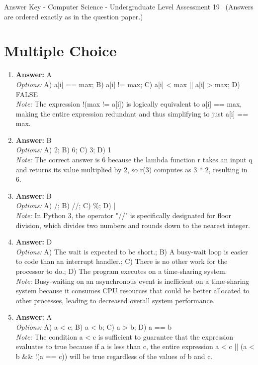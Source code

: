 \documentclass[12pt]{article}
\begin{document}
\begin{center}
Answer Key - Computer Science - Undergraduate Level Assessment 19 \
\small (Answers are ordered exactly as in the question paper.)
\end{center}

\section*{Multiple Choice}
\begin{enumerate}[label=\arabic*.]
\item \textbf{Answer:} A
\\ \textit{Options:} A) a[i] == max; B) a[i] != max; C) a[i] \textless{} max || a[i] \textgreater{} max; D) FALSE
\\ \textit{Note:} The expression !(max != a[i]) is logically equivalent to a[i] == max, making the entire expression redundant and thus simplifying to just a[i] == max.
\item \textbf{Answer:} B
\\ \textit{Options:} A) 2; B) 6; C) 3; D) 1
\\ \textit{Note:} The correct answer is 6 because the lambda function r takes an input q and returns its value multiplied by 2, so r(3) computes as 3 * 2, resulting in 6.
\item \textbf{Answer:} B
\\ \textit{Options:} A) /; B) //; C) \%; D) |
\\ \textit{Note:} In Python 3, the operator "//" is specifically designated for floor division, which divides two numbers and rounds down to the nearest integer.
\item \textbf{Answer:} D
\\ \textit{Options:} A) The wait is expected to be short.; B) A busy-wait loop is easier to code than an interrupt handler.; C) There is no other work for the processor to do.; D) The program executes on a time-sharing system.
\\ \textit{Note:} Busy-waiting on an asynchronous event is inefficient on a time-sharing system because it consumes CPU resources that could be better allocated to other processes, leading to decreased overall system performance.
\item \textbf{Answer:} A
\\ \textit{Options:} A) a \textless{} c; B) a \textless{} b; C) a \textgreater{} b; D) a == b
\\ \textit{Note:} The condition a \textless{} c is sufficient to guarantee that the expression evaluates to true because if a is less than c, the entire expression a \textless{} c || (a \textless{} b \&\& !(a == c)) will be true regardless of the values of b and c.
\end{enumerate}
\end{document}
